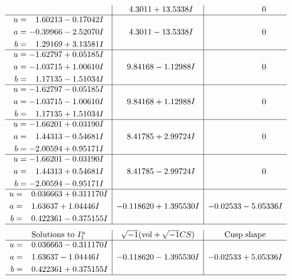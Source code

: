 \documentclass[1p]{elsarticle_modified}
\theoremstyle{definition}
\newcommand{\I}{\sqrt{-1}}
\begin{document}
$$\begin{array}{c|c|c}
 & \phantom{-}4.3011 + 13.5338 I & \phantom{-0.000000 } 0 \\ \hline\begin{aligned}
u &= \phantom{-}1.60213 - 0.17042 I \\
a &= -0.39966 - 2.52070 I \\
b &= \phantom{-}1.29169 + 3.13581 I\end{aligned}
 & \phantom{-}4.3011 - 13.5338 I & \phantom{-0.000000 } 0 \\ \hline\begin{aligned}
u &= -1.62797 + 0.05185 I \\
a &= -1.03715 + 1.00610 I \\
b &= \phantom{-}1.17135 - 1.51034 I\end{aligned}
 & \phantom{-}9.84168 - 1.12988 I & \phantom{-0.000000 } 0 \\ \hline\begin{aligned}
u &= -1.62797 - 0.05185 I \\
a &= -1.03715 - 1.00610 I \\
b &= \phantom{-}1.17135 + 1.51034 I\end{aligned}
 & \phantom{-}9.84168 + 1.12988 I & \phantom{-0.000000 } 0 \\ \hline\begin{aligned}
u &= -1.66201 + 0.03190 I \\
a &= \phantom{-}1.44313 - 0.54681 I \\
b &= -2.00594 + 0.95171 I\end{aligned}
 & \phantom{-}8.41785 + 2.99724 I & \phantom{-0.000000 } 0 \\ \hline\begin{aligned}
u &= -1.66201 - 0.03190 I \\
a &= \phantom{-}1.44313 + 0.54681 I \\
b &= -2.00594 - 0.95171 I\end{aligned}
 & \phantom{-}8.41785 - 2.99724 I & \phantom{-0.000000 } 0 \\ \hline\begin{aligned}
u &= \phantom{-}0.036663 + 0.311170 I \\
a &= \phantom{-}1.63637 + 1.04446 I \\
b &= \phantom{-}0.422361 - 0.375155 I\end{aligned}
 & -0.118620 + 1.395530 I & -0.02533 - 5.05336 I\\
 \hline 
 \end{array}$$\newpage$$\begin{array}{c|c|c}  
\text{Solutions to }I^u_{1}& \I (\text{vol} + \sqrt{-1}CS) & \text{Cusp shape}\\
 \hline 
\begin{aligned}
u &= \phantom{-}0.036663 - 0.311170 I \\
a &= \phantom{-}1.63637 - 1.04446 I \\
b &= \phantom{-}0.422361 + 0.375155 I\end{aligned}
 & -0.118620 - 1.395530 I & -0.02533 + 5.05336 I\\
 \hline 
 \end{array}$$\newpage\newpage\renewcommand{\arraystretch}{1}
\end{document}

